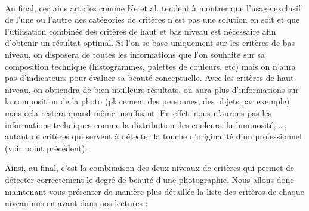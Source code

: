 \documentclass[11pt, french]{report-rd-info}
\begin{document}
\paragraph*{}
Au final, certains articles comme Ke et al. tendent à montrer que l'usage exclusif de l'une ou l'autre des catégories de critères n’est pas une solution en soit et que l’utilisation combinée des critères de haut et bas niveau est nécessaire afin d’obtenir un résultat optimal. Si l’on se base uniquement sur les critères de bas niveau, on disposera de toutes les informations que l’on souhaite sur sa composition technique (histogrammes, palettes de couleurs, etc) mais on n’aura pas d’indicateurs pour évaluer sa beauté conceptuelle. Avec les critères de haut niveau, on obtiendra de bien meilleurs résultats, on aura plus d’informations sur la composition de la photo (placement des personnes, des objets par exemple) mais cela restera quand même insuffisant. En effet, nous n’aurons pas les informations techniques comme la distribution des couleurs, la luminosité, \ldots, autant de critères qui servent à détecter la touche d’originalité d’un professionnel (voir point précédent).

Ainsi, au final, c’est la combinaison des deux niveaux de critères qui permet de détecter correctement le degré de beauté d’une photographie.
Nous allons donc maintenant vous présenter de manière plus détaillée la liste des critères de chaque niveau mis en avant dans nos lectures :
\end{document}
